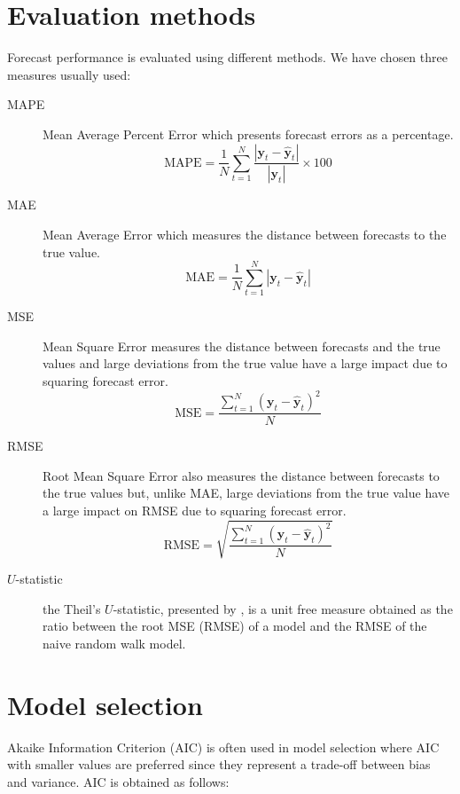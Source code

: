 \section{Evaluation methods} \label{sec:evaluation}

Forecast performance is evaluated using different methods. We have chosen three
measures usually used:
\begin{description}
\item[MAPE] Mean Average Percent Error which presents forecast errors as a
percentage.
\begin{equation}\label{eq:MAPE}
\text{MAPE} = \frac{1}{N} \sum_{t=1}^{N} 
\frac{\left|\mathbf{y}_t-\hat{\mathbf{y}}_t\right|}{\left|\mathbf{y}_t\right|}
 \times 100 
\end{equation}
\item[MAE] Mean Average Error which measures the distance between forecasts to the
true value.
\begin{equation}\label{eq:MAE}
\text{MAE} = \frac{1}{N} \sum_{t=1}^{N} 
\left| 
\mathbf{y}_t-\hat{\mathbf{y}}_t
\right| 
\end{equation}
\item[MSE]  Mean Square Error measures the distance between forecasts
and the true values and large deviations from the true value have a
large impact due to squaring forecast error.
\begin{equation}\label{eq:MSE}
\text{MSE} = 
\frac{\displaystyle \sum_{t=1}^{N} (\mathbf{y}_t-\hat{\mathbf{y}}_t)^2}{N}
\end{equation}
\item[RMSE] Root Mean Square Error also measures the distance between forecasts
to the true values but, unlike MAE, large deviations from the true value have a
large impact on RMSE due to squaring forecast error.
\begin{equation}\label{eq:RMSE}
\text{RMSE} = \sqrt{
\frac{\displaystyle \sum_{t=1}^{N} (\mathbf{y}_t-\hat{\mathbf{y}}_t)^2}{N}}
\end{equation}
\item[$U$-statistic] the Theil's $U$-statistic, presented by
\cite{theil1966}, is a unit free measure obtained as the ratio between the root
MSE (RMSE) of a model and the RMSE of the naive random walk model. 
\end{description}


\section{Model selection} \label{sec:pselection}
Akaike Information Criterion (AIC) is often used in model selection where AIC
with smaller values are preferred since they represent a trade-off between bias
and variance.  AIC is obtained as follows:

